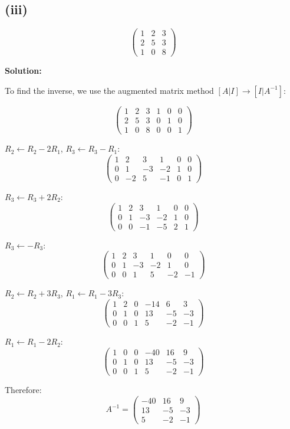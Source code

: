 \subsection*{(iii)}
\[
\begin{pmatrix}
1 & 2 & 3\\
2 & 5 & 3\\
1 & 0 & 8
\end{pmatrix}
\]

\textbf{Solution:}

To find the inverse, we use the augmented matrix method $[A|I] \rightarrow [I|A^{-1}]$:

\[
\left(\begin{array}{ccc|ccc}
1 & 2 & 3 & 1 & 0 & 0\\
2 & 5 & 3 & 0 & 1 & 0\\
1 & 0 & 8 & 0 & 0 & 1
\end{array}\right)
\]

$R_2 \leftarrow R_2 - 2R_1$, $R_3 \leftarrow R_3 - R_1$:
\[
\left(\begin{array}{ccc|ccc}
1 & 2 & 3 & 1 & 0 & 0\\
0 & 1 & -3 & -2 & 1 & 0\\
0 & -2 & 5 & -1 & 0 & 1
\end{array}\right)
\]

$R_3 \leftarrow R_3 + 2R_2$:
\[
\left(\begin{array}{ccc|ccc}
1 & 2 & 3 & 1 & 0 & 0\\
0 & 1 & -3 & -2 & 1 & 0\\
0 & 0 & -1 & -5 & 2 & 1
\end{array}\right)
\]

$R_3 \leftarrow -R_3$:
\[
\left(\begin{array}{ccc|ccc}
1 & 2 & 3 & 1 & 0 & 0\\
0 & 1 & -3 & -2 & 1 & 0\\
0 & 0 & 1 & 5 & -2 & -1
\end{array}\right)
\]

$R_2 \leftarrow R_2 + 3R_3$, $R_1 \leftarrow R_1 - 3R_3$:
\[
\left(\begin{array}{ccc|ccc}
1 & 2 & 0 & -14 & 6 & 3\\
0 & 1 & 0 & 13 & -5 & -3\\
0 & 0 & 1 & 5 & -2 & -1
\end{array}\right)
\]

$R_1 \leftarrow R_1 - 2R_2$:
\[
\left(\begin{array}{ccc|ccc}
1 & 0 & 0 & -40 & 16 & 9\\
0 & 1 & 0 & 13 & -5 & -3\\
0 & 0 & 1 & 5 & -2 & -1
\end{array}\right)
\]

Therefore:
\[
A^{-1} = \begin{pmatrix}
-40 & 16 & 9\\
13 & -5 & -3\\
5 & -2 & -1
\end{pmatrix}
\]